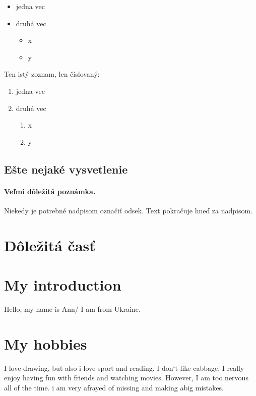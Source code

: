 \documentclass[10pt,twoside,english,a4paper]{article}
\begin{document}
\begin{itemize}
\item jedna vec
\item druhá vec
	\begin{itemize}
	\item x
	\item y
	\end{itemize}
\end{itemize}

Ten istý zoznam, len číslovaný:

\begin{enumerate}
\item jedna vec
\item druhá vec
	\begin{enumerate}
	\item x
	\item y
	\end{enumerate}
\end{enumerate}


\subsection{Ešte nejaké vysvetlenie} \label{ina:este}

\paragraph{Veľmi dôležitá poznámka.}
Niekedy je potrebné nadpisom označiť odsek. Text pokračuje hneď za nadpisom.



\section{Dôležitá časť} \label{dolezita}


\section*{My introduction}
Hello, my name is Ann/ I am from Ukraine.
\section*{My hobbies}




I love drawing, but also i love sport and reading.
I don`t like cabbage. I  really enjoy having fun with friends and watching movies. However, I am too nervous all of the time. i am very afrayed of missing and making  abig mistakes.
\end{document}

